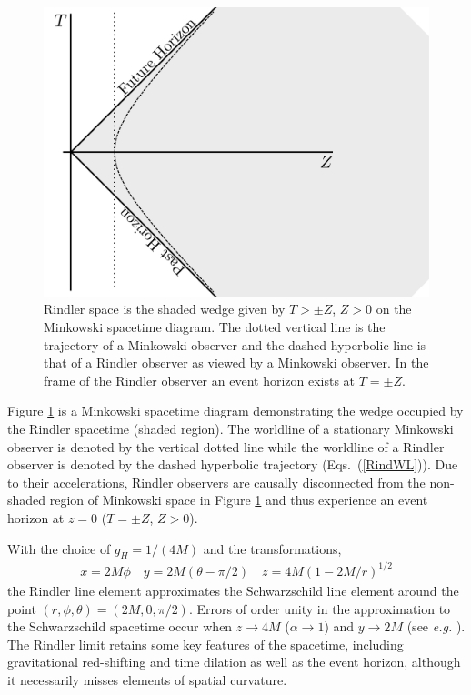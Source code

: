 \begin{figure}
\begin{center}
\includegraphics[scale=0.35]{figures/ch6/MinkRind_STDiagram.pdf}
\end{center}
\caption{Rindler space is the shaded wedge  given by $T > \pm Z$,
  $Z>0$ on the Minkowski spacetime diagram. The dotted vertical line
  is the trajectory of a Minkowski observer and the dashed hyperbolic
  line is that of a Rindler observer as viewed by a Minkowski
  observer. In the frame of the Rindler observer an event horizon
  exists at $T=\pm Z$.}
\label{Fig:MinkRind}
\end{figure}

Figure \ref{Fig:MinkRind} is a Minkowski spacetime diagram
demonstrating the wedge occupied by the Rindler spacetime (shaded
region). The worldline of a stationary Minkowski observer is denoted
by the vertical dotted line while the worldline of a Rindler observer
is denoted by the dashed hyperbolic trajectory (Eqs.\
(\ref{RindWL})). Due to their accelerations, Rindler
observers are causally disconnected from the non-shaded region of
Minkowski space in Figure \ref{Fig:MinkRind} and thus experience an
event horizon at $z=0$ ($T=\pm Z$, $Z>0$).

With the choice of $g_H=1/(4M)$ and the transformations,
\begin{align}
x = 2M \phi \quad  y = 2M\left( \theta -\pi/2\right) \quad z = 4M\left( 1-2M/r\right)^{1/2} 
\label{RindtoSch}
\end{align}
the Rindler line element approximates the
Schwarzschild line element around the point $(r, \phi, \theta)=( 2M, 0, \pi/2)$. Errors of order unity in
the approximation to the Schwarzschild spacetime occur when $z
\rightarrow 4M$ ($\alpha \rightarrow 1$) and $y \rightarrow 2M$ (see \textit{e.g.}
\citep{MP3_MS:1985}). The Rindler limit retains some key
features of the spacetime, including gravitational red-shifting and time
dilation as well as the event horizon, although it necessarily misses
elements of spatial curvature.



